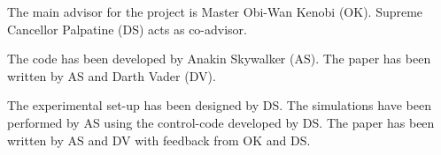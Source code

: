 %
\begin{divisionofwork}
{%
	The main advisor for the project is Master Obi-Wan Kenobi (OK).
	Supreme Cancellor Palpatine (DS) acts as co-advisor.
}%

	\paperitem
		The code has been developed by Anakin Skywalker (AS).
		The paper has been written by AS and Darth Vader (DV).

	\paperitem
		The experimental set-up has been designed by DS.
		The simulations have been performed by AS using the control-code
		developed by DS.
		The paper has been written by AS and DV with feedback from OK and DS.

\end{divisionofwork}


%
\tableofcontents
